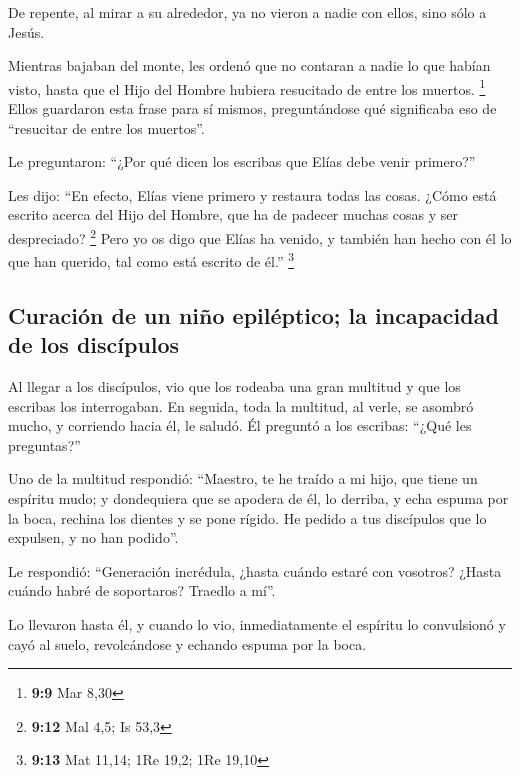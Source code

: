 \begin{paracol}{2}
 De repente, al mirar a su alrededor, ya no vieron a nadie
con ellos, sino sólo a Jesús.

 Mientras bajaban del monte, les ordenó que no contaran a
nadie lo que habían visto, hasta que el Hijo del Hombre hubiera
resucitado de entre los muertos. \footnote{\textbf{9:9} Mar 8,30}
 Ellos guardaron esta frase para sí mismos, preguntándose
qué significaba eso de ``resucitar de entre los muertos''.

 Le preguntaron: ``¿Por qué dicen los escribas que Elías
debe venir primero?''

 Les dijo: ``En efecto, Elías viene primero y restaura
todas las cosas. ¿Cómo está escrito acerca del Hijo del Hombre, que ha
de padecer muchas cosas y ser despreciado? \footnote{\textbf{9:12} Mal
  4,5; Is 53,3}  Pero yo os digo que Elías ha venido, y
también han hecho con él lo que han querido, tal como está escrito de
él.'' \footnote{\textbf{9:13} Mat 11,14; 1Re 19,2; 1Re 19,10}

\hypertarget{curaciuxf3n-de-un-niuxf1o-epiluxe9ptico-la-incapacidad-de-los-discuxedpulos}{%
\subsection{Curación de un niño epiléptico; la incapacidad de los
discípulos}\label{curaciuxf3n-de-un-niuxf1o-epiluxe9ptico-la-incapacidad-de-los-discuxedpulos}}

 Al llegar a los discípulos, vio que los rodeaba una gran
multitud y que los escribas los interrogaban.  En
seguida, toda la multitud, al verle, se asombró mucho, y corriendo hacia
él, le saludó.  Él preguntó a los escribas: ``¿Qué les
preguntas?''

 Uno de la multitud respondió: ``Maestro, te he traído a
mi hijo, que tiene un espíritu mudo;  y dondequiera que
se apodera de él, lo derriba, y echa espuma por la boca, rechina los
dientes y se pone rígido. He pedido a tus discípulos que lo expulsen, y
no han podido''.

 Le respondió: ``Generación incrédula, ¿hasta cuándo
estaré con vosotros? ¿Hasta cuándo habré de soportaros? Traedlo a mí''.

 Lo llevaron hasta él, y cuando lo vio, inmediatamente el
espíritu lo convulsionó y cayó al suelo, revolcándose y echando espuma
por la boca.


\end{paracol}
